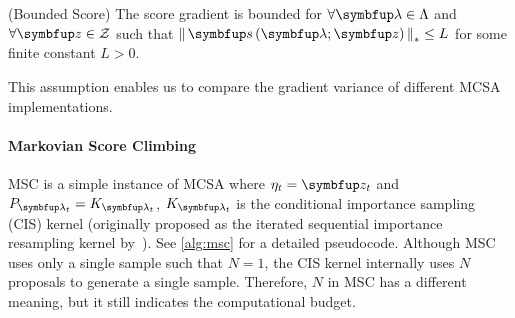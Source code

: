 
\begin{assumption}{(Bounded Score)}\label{thm:bounded_score}
  The score gradient is bounded for \(\forall \vlambda \in \Lambda\) and \(\forall \vz \in \mathcal{Z}\) such that \(\norm{\vs\left(\vlambda; \vz\right)}_* \leq L \) for some finite constant \(L > 0\).
\end{assumption}
\vspace{-0.05in}
This assumption enables us to compare the gradient variance of different MCSA implementations.

\vspace{-0.05in}
\paragraph{Markovian Score Climbing}
MSC is a simple instance of MCSA where \(\eta_t = \vz_t\) and \(P_{\vlambda_t} = K_{\vlambda_t}\), \(K_{\vlambda_t}\) is the conditional importance sampling (CIS) kernel (originally proposed as the iterated sequential importance resampling kernel by~\citet{andrieu_uniform_2018}).
See \cref{alg:msc} for a detailed pseudocode.
Although MSC uses only a single sample such that \(N=1\), the CIS kernel internally uses \(N\) proposals to generate a single sample.
Therefore, \(N\) in MSC has a different meaning, but it still indicates the computational budget.




\vspace{-0.1in}
